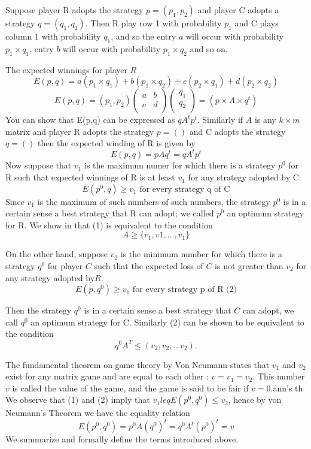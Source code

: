 \documentclass[]{report}
\begin{document}
Suppose player R adopts the strategy $p=(p_1,p_2)$ and player C adopts a strategy $q=(q_1,q_2)$. Then R play row 1 with 
probability $p_1$ and C plays column 1 with probability $q_1$, and so the entry $a$ will occur with probability $p_1 \times q_1$, entry $b$ will occur with probability $p_1 \times q_2$ and so on.

The expected winnings for player $R$
\[ E(p,q) = a(p_1 \times q_1) + b(p_1 \times q_2) + c(p_2 \times q_1) + d(p_2 \times q_2) \]
\[ E(p,q) = (p_1,p_2) \left(\begin{array}{cc} 
a & b \\
c & d \\ \end{array} \right)\left(\begin{array}{c} 
q_1\\
q_2\\ \end{array} \right) = (p \times A \times q^t) \]
You can show that E(p,q) can be expressed as $q A^t p^t$.
\smallskip
Similarly if $A$ is any $k \times m$ matrix and player R adopts the strategy $p=()$ and C adopts the strategy $q=()$ then the expected winding of R is given by
\[ E(p,q) =  pAq^t = q A^t p^t \]
Now suppose that $v_1$ is the maximum numer for which there is a strategy $p^0$ for R such that expected winnings of R is at least $v_1$ for any strategy adopted by C:
\[E(p^0,q) \geq v_1  \mbox{ for every strategy q of C}\]
Since $v_1$ is the maximum of such numbers of such numbers, the strategy $p^0$ is in a certain sense a best strategy that R can adopt; we called $p^0$ an optimum strategy for R.
We show in that (1) is equivalent to the condition
\[ A \geq \{ v_1,v1,\ldots,v_1 \}\]

On the other hand, suppose $v_2$ is the minimum number for which there is a strategy $q^0$ for player $C$ such that 
the expected loss of $C$ is not greater than $v_2$ for any strategy adopted by$R$.
\[E(p,q^0) \geq v_1  \mbox{ for every strategy p of R (2)}\]

Then the strategy $q^0$ is in a certain sense a best strategy that $C$ can adopt, we call $q^0$ an optimum strategy for C.
Similarly (2) can be shown to be equivalent to the condition
\[ q^0A^T \leq  (v_2,v_2,\ldots v_2). \]

The fundamental theorem on game theory by Von Neumann states that $v_1$ and $v_2$ exist for any matrix game
and are equal to each other : $v = v_1 = v_2$. This number $v$ is called the value of the game, and the game is said to be fair if $v=0$.ann's th
We observe that (1) and (2) imply that $v_1 leq E(p^0,q^0) \leq v_2$, hence by von Neumann's Theorem we have the 
equality relation
\[ E(p^0,q^0) = p^0 A (q^0)^{t} = q^0 A^t (p^0)^{t} = v\]
We summarize and formally define the terms introduced above.
\end{document}
